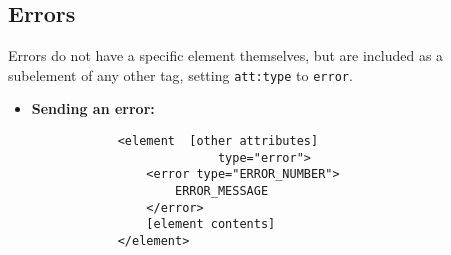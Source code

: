 \subsection{Errors}

Errors do not have a specific element themselves, but are included as a subelement of any other tag, setting \verb!att:type! to \verb!error!.

\begin{itemize}
	\item \textbf{Sending an error:}
		\begin{verbatim}
			<element  [other attributes]
				          type="error">
			    <error type="ERROR_NUMBER">
			        ERROR_MESSAGE
			    </error>
			    [element contents]
			</element>
		\end{verbatim}
\end{itemize}